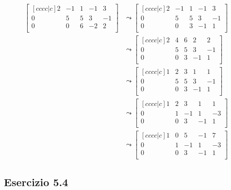 \documentclass{article}
\begin{document}
\[\begin{aligned}
    \begin{bmatrix}[cccc|c]
        2 & -1 & 1 & -1 & 3 \\
        0 & 5 & 5 & 3 & -1 \\
        0 & 0 & 6 & -2 & 2 \\
    \end{bmatrix} &\leadsto \begin{bmatrix}[cccc|c]
        2 & -1 & 1 & -1 & 3 \\
        0 & 5 & 5 & 3 & -1 \\
        0 & 0 & 3 & -1 & 1 \\
    \end{bmatrix} \\&\leadsto \begin{bmatrix}[cccc|c]
        2 & 4 & 6 & 2 & 2 \\
        0 & 5 & 5 & 3 & -1 \\
        0 & 0 & 3 & -1 & 1 \\
    \end{bmatrix} \\&\leadsto \begin{bmatrix}[cccc|c]
        1 & 2 & 3 & 1 & 1 \\
        0 & 5 & 5 & 3 & -1 \\
        0 & 0 & 3 & -1 & 1 \\
    \end{bmatrix} \\&\leadsto \begin{bmatrix}[cccc|c]
        1 & 2 & 3 & 1 & 1 \\
        0 & 1 & -1 & 1 & -3 \\
        0 & 0 & 3 & -1 & 1 \\
    \end{bmatrix} \\&\leadsto \begin{bmatrix}[cccc|c]
        1 & 0 & 5 & -1 & 7 \\
        0 & 1 & -1 & 1 & -3 \\
        0 & 0 & 3 & -1 & 1 \\
    \end{bmatrix}
\end{aligned}\]

\pagebreak

\subsection*{Esercizio 5.4}
\end{document}

